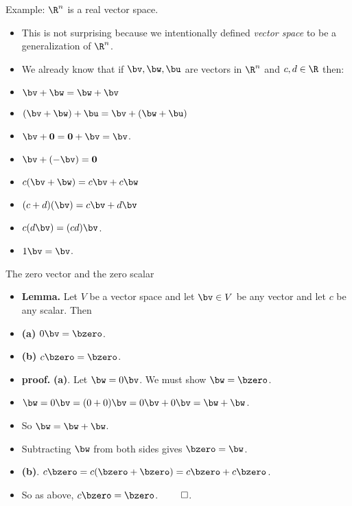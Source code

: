 \documentclass{beamer}
\begin{document}
\begin{frame}{Example: $\R^n$ is a real vector space.}

\begin{itemize}
\item This is not surprising because we intentionally defined \emph{vector space}
to be a generalization of $\R^n$.
\item We already know that if $\bv, \bw, \bu$ are vectors in $\R^n$ and
$c,d\in\R$ then:
\item $\bv+\bw = \bw + \bv$
\item $(\bv + \bw) + \bu = \bv + (\bw + \bu)$
\item $\bv + \textbf{0} = \textbf{0} + \bv = \bv$.
\item $\bv + (-\bv) = \textbf{0}$
\item $c(\bv + \bw) = c\bv + c\bw$
\item $(c+d)(\bv) = c\bv + d\bv$
\item $c(d\bv) = (c d) \bv$.
\item $1 \bv = \bv$.
\end{itemize}
\end{frame}

\begin{frame}{The zero vector and the zero scalar}

\begin{itemize}
\item \textbf{Lemma.} Let $V$ be a vector space and let $\bv \in V$ be
any vector and let $c$ be any scalar. Then
\item \textbf{(a)} $0 \bv = \bzero$.
\item \textbf{(b)} $c \bzero = \bzero$.
\item \textbf{proof.} \textbf{(a)}. Let $\bw = 0\bv$. We must show $\bw=\bzero$.
\item $\bw = 0\bv = (0+0)\bv = 0\bv + 0\bv = \bw+\bw$.
\item So $\bw = \bw + \bw$.
\item Subtracting $\bw$ from both sides gives $\bzero = \bw$.
\item \textbf{(b)}. $c\bzero = c(\bzero + \bzero) = c\bzero + c\bzero$.
\item So as above, $c\bzero = \bzero$. $\qed$.
\end{itemize}
\end{frame}
\end{document}
